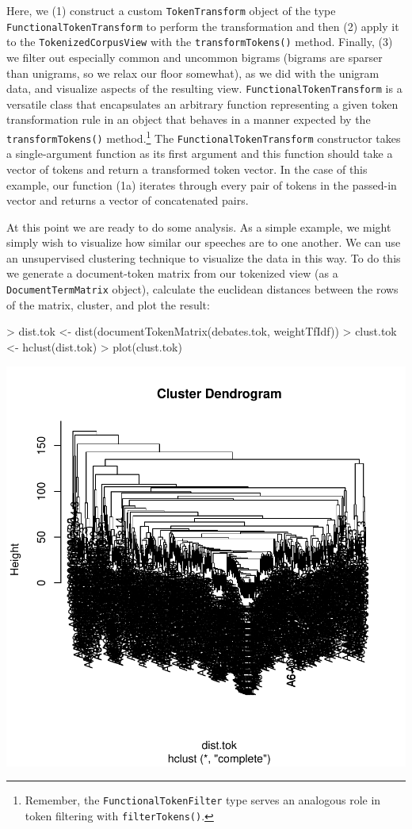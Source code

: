 \documentclass[11pt]{article}
\let\code=\texttt
\let\rclass=\texttt
\begin{document}
Here, we (1) construct a custom \rclass{TokenTransform} object of the
type \rclass{FunctionalTokenTransform} to perform the transformation
and then (2) apply it to the \rclass{TokenizedCorpusView} with the
\code{transformTokens()} method.  Finally, (3) we filter out especially
common and uncommon bigrams (bigrams are sparser than unigrams, so we
relax our floor somewhat), as we did with the unigram data, and
visualize aspects of the resulting view.
\rclass{FunctionalTokenTransform} is a versatile class that
encapsulates an arbitrary function representing a given token
transformation rule in an object that behaves in a manner expected by
the \code{transformTokens()} method.\footnote{Remember, the
\rclass{FunctionalTokenFilter} type serves an analogous role in token
filtering with \code{filterTokens()}.}  The
\rclass{FunctionalTokenTransform} constructor takes a single-argument
function as its first argument and this function should take a vector
of tokens and return a transformed token vector.  In the case of this
example, our function (1a) iterates through every pair of tokens in
the passed-in vector and returns a vector of concatenated pairs.

At this point we are ready to do some analysis.  As a simple example, we
might simply wish to visualize how similar our speeches are to one
another.  We can use an unsupervised clustering technique to visualize
the data in this way.  To do this we generate a document-token matrix
from our tokenized view (as a \rclass{DocumentTermMatrix} object),
calculate the euclidean distances between the rows of the matrix,
cluster, and plot the result:
\begin{Schunk}
\begin{Sinput}
> dist.tok <- dist(documentTokenMatrix(debates.tok, weightTfIdf))
> clust.tok <- hclust(dist.tok)
> plot(clust.tok)
\end{Sinput}
\end{Schunk}
\includegraphics{intro-021}
\end{document}
